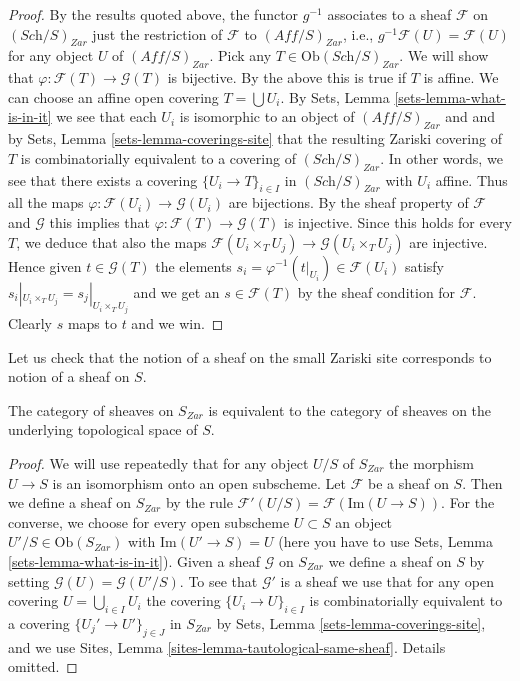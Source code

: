 \begin{proof}
\medskip\noindent
By the results quoted above,
the functor $g^{-1}$ associates to a sheaf $\mathcal{F}$ on
$(\textit{Sch}/S)_{Zar}$ just the restriction of $\mathcal{F}$
to $(\textit{Aff}/S)_{Zar}$, i.e., $g^{-1}\mathcal{F}(U) = \mathcal{F}(U)$
for any object $U$ of $(\textit{Aff}/S)_{Zar}$. Pick any
$T \in \text{Ob}(\textit{Sch}/S)_{Zar}$. We will show that
$\varphi : \mathcal{F}(T) \to \mathcal{G}(T)$ is bijective.
By the above this is true if $T$ is affine.
We can choose an affine open covering $T = \bigcup U_i$. By
Sets, Lemma \ref{sets-lemma-what-is-in-it} we see that
each $U_i$ is isomorphic to an object of $(\textit{Aff}/S)_{Zar}$
and and by Sets, Lemma \ref{sets-lemma-coverings-site}
that the resulting Zariski covering of $T$ is combinatorially
equivalent to a covering of $(\textit{Sch}/S)_{Zar}$.
In other words, we see that there exists a covering
$\{U_i \to T\}_{i \in I}$ in $(\textit{Sch}/S)_{Zar}$ with $U_i$ affine.
Thus all the maps $\varphi : \mathcal{F}(U_i) \to \mathcal{G}(U_i)$
are bijections. By the sheaf property of $\mathcal{F}$ and $\mathcal{G}$
this implies that $\varphi : \mathcal{F}(T) \to \mathcal{G}(T)$ is injective.
Since this holds for every $T$, we deduce that also the maps
$\mathcal{F}(U_i \times_T U_j) \to \mathcal{G}(U_i \times_T U_j)$
are injective. Hence given $t \in \mathcal{G}(T)$
the elements $s_i = \varphi^{-1}(t|_{U_i}) \in \mathcal{F}(U_i)$
satisfy $s_i|_{U_i \times_T U_j} = s_j|_{U_i \times_T U_j}$
and we get an $s \in \mathcal{F}(T)$ by the sheaf condition
for $\mathcal{F}$. Clearly $s$ maps to $t$ and we win.
\end{proof}

\noindent
Let us check that the notion of a sheaf on the small Zariski site
corresponds to notion of a sheaf on $S$.

\begin{lemma}
\label{lemma-Zariski-usual}
The category of sheaves on $S_{Zar}$ is equivalent to the
category of sheaves on the underlying topological space of $S$.
\end{lemma}

\begin{proof}
We will use repeatedly that for any object
$U/S$ of $S_{Zar}$ the morphism $U \to S$ is an isomorphism
onto an open subscheme.
Let $\mathcal{F}$ be a sheaf on $S$. Then we define a sheaf
on $S_{Zar}$ by the rule $\mathcal{F}'(U/S) = \mathcal{F}(\text{Im}(U \to S))$.
For the converse, we choose for every open subscheme $U \subset S$ an object
$U'/S \in \text{Ob}(S_{Zar})$ with $\text{Im}(U' \to S) = U$
(here you have to use Sets, Lemma \ref{sets-lemma-what-is-in-it}).
Given a sheaf $\mathcal{G}$ on $S_{Zar}$ we define a sheaf on $S$ by setting
$\mathcal{G}(U) = \mathcal{G}(U'/S)$. To see that $\mathcal{G}'$ is
a sheaf we use that for any open covering $U = \bigcup_{i \in I} U_i$
the covering $\{U_i \to U\}_{i \in I}$
is combinatorially equivalent to a covering $\{U_j' \to U'\}_{j \in J}$
in $S_{Zar}$ by Sets, Lemma \ref{sets-lemma-coverings-site},
and we use Sites, Lemma \ref{sites-lemma-tautological-same-sheaf}.
Details omitted.
\end{proof}

